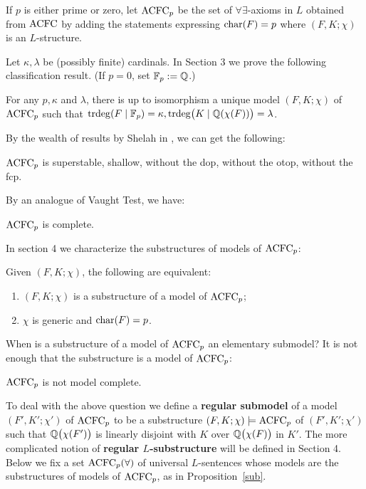 \noindent If $p$ is either prime or zero, let $\mathrm{ACFC}_p$ be the set of $\forall\exists$-axioms in $L$ obtained from $\mathrm{ACFC}$ by adding the statements expressing  $\mathrm{char}(F)=p$ where $(F, K;\chi)$ is an $L$-structure. 


\noindent Let $\kappa, \lambda$ be (possibly finite) cardinals. In Section 3 we prove the following classification result. (If $p=0$, set $\mathbb{F}_p:=\mathbb{Q}$.) 

\begin{thm} \label{1.2}
For any $p,\kappa$ and $\lambda$, there is up to isomorphism a unique model $(F, K; \chi)$ of $\mathrm{ACFC}_p$ such that $\mathrm{trdeg}(F \mid \mathbb{F}_p) = \kappa, \mathrm{trdeg}\big(K \mid \mathbb{Q}( \chi(F))\big)= \lambda$. 
\end{thm}

\noindent
By the wealth of results by Shelah in \cite{Shelah}, we can get the following:

\begin{cor}
$\mathrm{ACFC}_p$ is superstable, shallow, without the dop, without the otop, without the fcp.
\end{cor}

\noindent
By an analogue of Vaught Test, we have:

\begin{thm}
$\mathrm{ACFC}_p$ is complete.
\end{thm}

\noindent
In section 4 we characterize the substructures of models of $\mathrm{ACFC}_p$:  
\begin{prop}\label{sub} Given $(F, K; \chi)$, the following are equivalent:
\begin{enumerate}
\item $(F, K; \chi)$ is a substructure of a model of $\mathrm{ACFC}_p$;
\item$\chi$ is generic and $\mathrm{char}(F)=p$.
\end{enumerate}
\end{prop}

\noindent
When is a substructure of a model of  $\mathrm{ACFC}_p$ an 
elementary submodel?  It is not enough that the substructure is 
a model of $\mathrm{ACFC}_p$:

\begin{prop}
$\mathrm{ACFC}_p$ is not model complete.
\end{prop}

\noindent
To deal with the above question we define
a {\bf regular submodel} of a model $(F', K';\chi')$ of $\mathrm{ACFC}_p$ to be
a substructure $(F, K;\chi)\models \mathrm{ACFC}_p$ of $(F', K';\chi')$ such that
 $\mathbb{Q}\big(\chi(F')\big) $ is linearly disjoint with $ K$ over $\mathbb{Q}\big(\chi(F)\big)$ in $K'$. 
The more complicated notion of {\bf regular $L$-substructure} will be defined in Section 4. Below we fix a set  $\mathrm{ACFC}_p(\forall)$ of universal 
$L$-sentences whose models are the substructures of models of $\mathrm{ACFC}_p$, as in
Proposition~\ref{sub}. 

